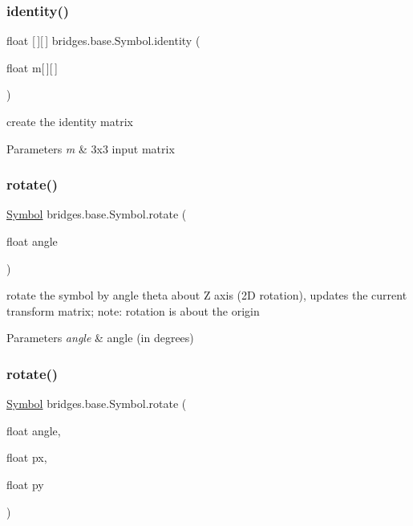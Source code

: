 \subsubsection{\texorpdfstring{identity()}{identity()}}
{\footnotesize\ttfamily float \mbox{[}$\,$\mbox{]}\mbox{[}$\,$\mbox{]} bridges.\+base.\+Symbol.\+identity (\begin{DoxyParamCaption}\item[{float}]{m\mbox{[}$\,$\mbox{]}\mbox{[}$\,$\mbox{]} }\end{DoxyParamCaption})}

create the identity matrix


\begin{DoxyParams}{Parameters}
{\em m} & 3x3 input matrix \\
\hline
\end{DoxyParams}
\mbox{\label{classbridges_1_1base_1_1_symbol_a1104bb7acb941b8fa7325eec8fec0017}} 
\subsubsection{\texorpdfstring{rotate()}{rotate()}\hspace{0.1cm}{\footnotesize\ttfamily [1/2]}}
{\footnotesize\ttfamily \hyperlink{classbridges_1_1base_1_1_symbol}{Symbol} bridges.\+base.\+Symbol.\+rotate (\begin{DoxyParamCaption}\item[{float}]{angle }\end{DoxyParamCaption})}

rotate the symbol by angle theta about Z axis (2D rotation), updates the current transform matrix; note\+: rotation is about the origin


\begin{DoxyParams}{Parameters}
{\em angle} & angle (in degrees) \\
\hline
\end{DoxyParams}
\mbox{\label{classbridges_1_1base_1_1_symbol_a641536133905ee0141d87ba928cdc451}} 
\subsubsection{\texorpdfstring{rotate()}{rotate()}\hspace{0.1cm}{\footnotesize\ttfamily [2/2]}}
{\footnotesize\ttfamily \hyperlink{classbridges_1_1base_1_1_symbol}{Symbol} bridges.\+base.\+Symbol.\+rotate (\begin{DoxyParamCaption}\item[{float}]{angle,  }\item[{float}]{px,  }\item[{float}]{py }\end{DoxyParamCaption})}

